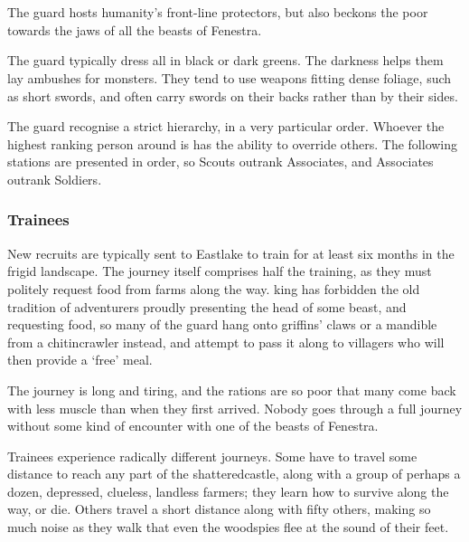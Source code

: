 \chapter{}

\label{guard}

\begin{multicols}{2}

\noindent
The \Gls{guard} hosts humanity's front-line protectors, but also beckons the poor towards the jaws of all the beasts of Fenestra.

The \Gls{guard} typically dress all in black or dark greens.
The darkness helps them lay ambushes for monsters.
They tend to use weapons fitting dense foliage, such as short swords, and often carry swords on their backs rather than by their sides.

The \Gls{guard} recognise a strict hierarchy, in a very particular order.
Whoever the highest ranking person around is has the ability to override others.
The following stations are presented in order, so Scouts outrank Associates, and Associates outrank Soldiers.

\subsection{Trainees}

New recruits are typically sent to Eastlake to train for at least six months in the frigid landscape.
The journey itself comprises half the training, as they must politely request food from farms along the way.
\Gls{king} has forbidden the old tradition of adventurers proudly presenting the head of some beast, and requesting food, so many of the guard hang onto griffins' claws or a mandible from a chitincrawler instead, and attempt to pass it along to villagers who will then provide a `free' meal.

The journey is long and tiring, and the rations are so poor that many come back with less muscle than when they first arrived.
Nobody goes through a full journey without some kind of encounter with one of the beasts of Fenestra.

Trainees experience radically different journeys.
Some have to travel some distance to reach any part of the \gls{shatteredcastle}, along with a group of perhaps a dozen, depressed, clueless, landless farmers; they learn how to survive along the way, or die.
Others travel a short distance along with fifty others, making so much noise as they walk that even the woodspies flee at the sound of their feet.


\end{multicols}
